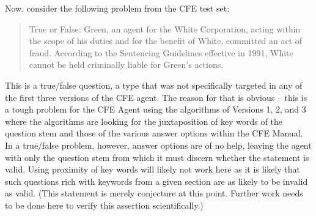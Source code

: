 Now, consider the following problem from the CFE test set:

\blockquote{True or False: Green, an agent for the White Corporation, acting within the scope of his duties and for the benefit of White, committed an act of fraud. According to the Sentencing Guidelines effective in 1991, White cannot be held criminally liable for Green’s actions.}

This is a true/false question, a type that was not specifically targeted in any of the first three versions of the CFE agent. The reason for that is obvious – this is a tough problem for the CFE Agent using the algorithms of Versions 1, 2, and 3 where the algorithms are looking for the juxtaposition of key words of the question stem and those of the various answer options within the CFE Manual. In a true/false problem, however, answer options are of no help, leaving the agent with only the question stem from which it must discern whether the statement is valid.  Using proximity of key words will likely not work here as it is likely that such questions rich with keywords from a given section are as likely to be invalid as valid. (This statement is merely conjecture at this point. Further work needs to be done here to verify this assertion scientifically.)

